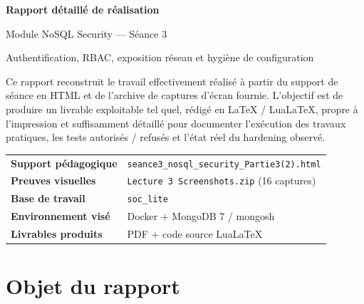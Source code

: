 \documentclass[11pt,a4paper]{article}
\begin{document}

\begin{titlepage}
\centering
\vspace*{1.6cm}

{\fontsize{28}{34}\selectfont\bfseries\color{SectionBlue}Rapport détaillé de réalisation\par}
\vspace{0.55cm}
{\fontsize{18}{22}\selectfont Module NoSQL Security --- Séance 3\par}
\vspace{0.35cm}
{\Large Authentification, RBAC, exposition réseau et hygiène de configuration\par}

\vspace{1.0cm}
\begin{summarybox}
Ce rapport reconstruit le travail effectivement réalisé à partir du support de séance en HTML et de l'archive de captures d'écran fournie. L'objectif est de produire un livrable exploitable tel quel, rédigé en LaTeX / LuaLaTeX, propre à l'impression et suffisamment détaillé pour documenter l'exécution des travaux pratiques, les tests autorisés / refusés et l'état réel du hardening observé.
\end{summarybox}

\vfill
\begin{minipage}{0.78\textwidth}
\centering
\begin{tabular}{>{\bfseries}p{4.8cm}p{7.2cm}}
Support pédagogique & \texttt{seance3\_nosql\_security\_Partie3(2).html} \\
Preuves visuelles & \texttt{Lecture 3 Screenshots.zip} (16 captures) \\
Base de travail & \texttt{soc\_lite} \\
Environnement visé & Docker + MongoDB 7 / mongosh \\
Livrables produits & PDF + code source LuaLaTeX \\
\end{tabular}
\end{minipage}

\vfill
\end{titlepage}

\clearpage
{}
\setcounter{page}{1}
\tableofcontents
\clearpage
\section{Objet du rapport}
\end{document}

